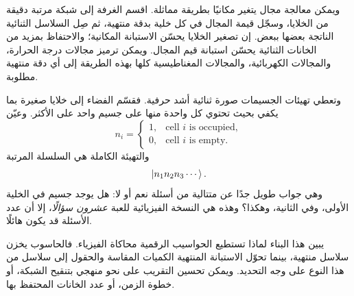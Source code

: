 ويمكن معالجة مجال يتغير مكانيًا بطريقة مماثلة. اقسم الغرفة إلى شبكة مرتبة دقيقة من الخلايا، وسجّل قيمة المجال في كل خلية بدقة منتهية، ثم صِل السلاسل الثنائية الناتجة بعضها ببعض. إن تصغير الخلايا يحسّن الاستبانة المكانية؛ والاحتفاظ بمزيد من الخانات الثنائية يحسّن استبانة قيم المجال. ويمكن ترميز مجالات درجة الحرارة، والمجالات الكهربائية، والمجالات المغناطيسية كلها بهذه الطريقة إلى أي دقة منتهية مطلوبة.

وتعطي تهيئات الجسيمات صورة ثنائية أشد حرفية. فقسّم الفضاء إلى خلايا صغيرة بما يكفي بحيث تحتوي كل واحدة منها على جسيم واحد على الأكثر. وعيّن
\begin{equation}
  n_i=
  \begin{cases}
    1,&\text{cell \(i\) is occupied},\\
    0,&\text{cell \(i\) is empty}.
  \end{cases}
  \label{eq:l01-occupancy-bit}
\end{equation}
والتهيئة الكاملة هي السلسلة المرتبة
\begin{equation}
  \left\lvert n_1n_2n_3\cdots\right\rangle.
\end{equation}
وهي جواب طويل جدًا عن متتالية من أسئلة نعم أو لا: هل يوجد جسيم في الخلية الأولى، وفي الثانية، وهكذا؟ وهذه هي النسخة الفيزيائية للعبة \emph{عشرون سؤالًا}، إلا أن عدد الأسئلة قد يكون هائلًا.

يبين هذا البناء لماذا تستطيع الحواسيب الرقمية محاكاة الفيزياء. فالحاسوب يخزن سلاسل منتهية، بينما تحوّل الاستبانة المنتهية الكميات المقاسة والحقول إلى سلاسل من هذا النوع على وجه التحديد. ويمكن تحسين التقريب على نحو منهجي بتنقيح الشبكة، أو خطوة الزمن، أو عدد الخانات المحتفظ بها.

\begin{classroomqa}
\end{classroomqa}

\begin{classroomqa}
\end{classroomqa}

